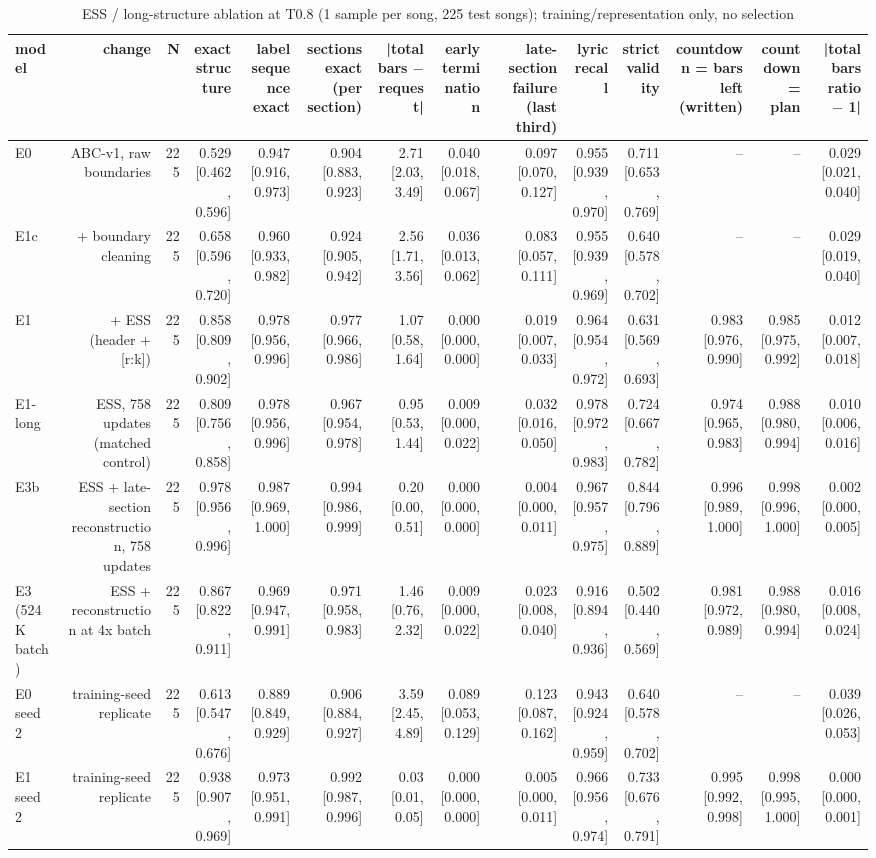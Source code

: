 \begin{table}[t]
\centering
\small
\begin{tabular}{lrrrrrrrrrrrrr}
\toprule
model & change & N & exact structure & label sequence exact & sections exact (per section) & |total bars $-$ request| & early termination & late-section failure (last third) & lyric recall & strict validity & countdown = bars left (written) & countdown = plan & |total bars ratio $-$ 1| \\
\midrule
E0 & ABC-v1, raw boundaries & 225 & 0.529 [0.462, 0.596] & 0.947 [0.916, 0.973] & 0.904 [0.883, 0.923] & 2.71 [2.03, 3.49] & 0.040 [0.018, 0.067] & 0.097 [0.070, 0.127] & 0.955 [0.939, 0.970] & 0.711 [0.653, 0.769] & – & – & 0.029 [0.021, 0.040] \\
E1c & + boundary cleaning & 225 & 0.658 [0.596, 0.720] & 0.960 [0.933, 0.982] & 0.924 [0.905, 0.942] & 2.56 [1.71, 3.56] & 0.036 [0.013, 0.062] & 0.083 [0.057, 0.111] & 0.955 [0.939, 0.969] & 0.640 [0.578, 0.702] & – & – & 0.029 [0.019, 0.040] \\
E1 & + ESS (header + [r:k]) & 225 & 0.858 [0.809, 0.902] & 0.978 [0.956, 0.996] & 0.977 [0.966, 0.986] & 1.07 [0.58, 1.64] & 0.000 [0.000, 0.000] & 0.019 [0.007, 0.033] & 0.964 [0.954, 0.972] & 0.631 [0.569, 0.693] & 0.983 [0.976, 0.990] & 0.985 [0.975, 0.992] & 0.012 [0.007, 0.018] \\
E1-long & ESS, 758 updates (matched control) & 225 & 0.809 [0.756, 0.858] & 0.978 [0.956, 0.996] & 0.967 [0.954, 0.978] & 0.95 [0.53, 1.44] & 0.009 [0.000, 0.022] & 0.032 [0.016, 0.050] & 0.978 [0.972, 0.983] & 0.724 [0.667, 0.782] & 0.974 [0.965, 0.983] & 0.988 [0.980, 0.994] & 0.010 [0.006, 0.016] \\
E3b & ESS + late-section reconstruction, 758 updates & 225 & 0.978 [0.956, 0.996] & 0.987 [0.969, 1.000] & 0.994 [0.986, 0.999] & 0.20 [0.00, 0.51] & 0.000 [0.000, 0.000] & 0.004 [0.000, 0.011] & 0.967 [0.957, 0.975] & 0.844 [0.796, 0.889] & 0.996 [0.989, 1.000] & 0.998 [0.996, 1.000] & 0.002 [0.000, 0.005] \\
E3 (524K batch) & ESS + reconstruction at 4x batch & 225 & 0.867 [0.822, 0.911] & 0.969 [0.947, 0.991] & 0.971 [0.958, 0.983] & 1.46 [0.76, 2.32] & 0.009 [0.000, 0.022] & 0.023 [0.008, 0.040] & 0.916 [0.894, 0.936] & 0.502 [0.440, 0.569] & 0.981 [0.972, 0.989] & 0.988 [0.980, 0.994] & 0.016 [0.008, 0.024] \\
E0 seed 2 & training-seed replicate & 225 & 0.613 [0.547, 0.676] & 0.889 [0.849, 0.929] & 0.906 [0.884, 0.927] & 3.59 [2.45, 4.89] & 0.089 [0.053, 0.129] & 0.123 [0.087, 0.162] & 0.943 [0.924, 0.959] & 0.640 [0.578, 0.702] & – & – & 0.039 [0.026, 0.053] \\
E1 seed 2 & training-seed replicate & 225 & 0.938 [0.907, 0.969] & 0.973 [0.951, 0.991] & 0.992 [0.987, 0.996] & 0.03 [0.01, 0.05] & 0.000 [0.000, 0.000] & 0.005 [0.000, 0.011] & 0.966 [0.956, 0.974] & 0.733 [0.676, 0.791] & 0.995 [0.992, 0.998] & 0.998 [0.995, 1.000] & 0.000 [0.000, 0.001] \\
\bottomrule
\end{tabular}
\caption{ESS / long-structure ablation at T0.8 (1 sample per song, 225 test songs); training/representation only, no selection}
\label{tab:ess_ablation_T08}
\end{table}
